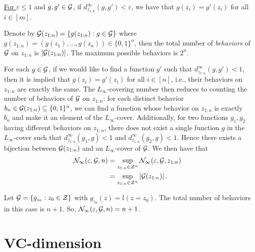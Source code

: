 \documentclass[twoside]{article}
\newcommand{\set}[1]{\left\{#1\right\}}
\newcommand{\I}{\mathbb{I}}
\newcommand{\VC}{\mathrm{VC}}
\begin{document}
\underline{For $\varepsilon \le  1$} and $g, g' \in \mathcal{G}$, if $d_{z_{1:n}}^\infty (g, g') < \varepsilon$, we have that $g(z_i) = g'(z_i)$ for all $i \in [m]$. 

Denote by $\cG(z_{1:n}) = \set{g(z_{1:n}) : g \in \cG}$ where $g(z_{1:n})=(g(z_1),...,g(z_n))\in \{0,1\}^n$, then the total number of \emph{behaviors} of $\mathcal{G}$ on $z_{1:n}$ is $|\mathcal{G}(z_{1:n})|$. 
The maximum possible behaviors is $2^n$. 

For each $g\in \mathcal{G}$, if we would like to find a function $g'$ such that $d_{z_{1:n}}^\infty (g, g') < 1$, then it is implied that $g(z_i) = g'(z_i)$ for all $i\in [n]$, i.e., their behaviors on $z_{1:n}$ are exactly the same. The $L_\infty$-covering number then reduces to counting the number of behaviors of $\mathcal{G}$ on $z_{1:n}$: for each distinct behavior $b_n\in \mathcal{G}(z_{1:n})\subseteq \{0,1\}^n$, we can find a function whose behavior on $z_{1:n}$ is exactly $b_n$ and make it an element of the $L_\infty$-cover. Additionally, for two functions $g_1,g_2$ having different behaviors on $z_{1:n}$, there does not exist a single function $g$ in the $L_\infty$-cover such that $d_{z_{1:n}}^\infty (g_1, g) < 1$ and $d_{z_{1:n}}^\infty (g_2, g) < 1$. Hence there exists a bijection between $\mathcal{G}(z_{1:n})$ and an $L_\infty$-cover of $\mathcal{G}$. We then have that
\begin{align*}
    \mathcal{N}_{\infty}(\varepsilon, \mathcal{G}, n) &= \sup_{z_{1:n} \in \mathcal{Z}^n} \mathcal{N}_\infty(\varepsilon, \mathcal{G}, z_{1:n}) \\
    & = \sup_{z_{1:n} \in \mathcal{Z}^n} |\mathcal{G}(z_{1:n})| \,.
\end{align*}
\begin{example}\label{eg:indicator_class}
    Let $\cG = \set{ g_{z_0} : z_0 \in \cZ }$ with $g_{z_0}(z) = \I(z = z_0)$. The total number of behaviors in this case is $n+1$. So, $\mathcal{N}_\infty(\varepsilon, \mathcal{G}, n) = n+1$.
\end{example}

\section{VC-dimension}
\end{document}
